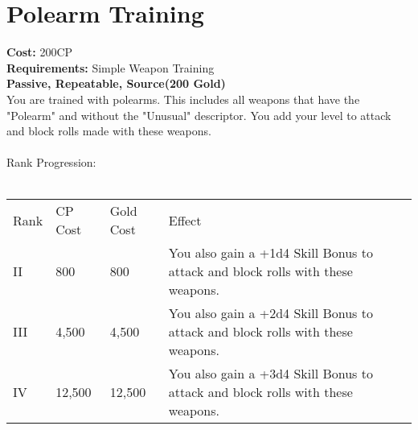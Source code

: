 \section{Polearm Training}\label{perk:polearmTraining}
\textbf{Cost:} 200CP\\
\textbf{Requirements:} Simple Weapon Training\\
\textbf{Passive, Repeatable, Source(200 Gold)}\\
You are trained with polearms.
This includes all weapons that have the "Polearm" and without the "Unusual" descriptor.
You add your level to attack and block rolls made with these weapons.\\
\\
Rank Progression:\\
\\
\begin{tabular}{l | l | l | l}
	Rank & CP Cost & Gold Cost & Effect\\
	II & 800 & 800 & You also gain a +1d4 Skill Bonus to attack and block rolls with these weapons.\\
	III & 4,500 & 4,500 & You also gain a +2d4 Skill Bonus to attack and block rolls with these weapons.\\
	IV & 12,500 & 12,500 & You also gain a +3d4 Skill Bonus to attack and block rolls with these weapons.\\
\end{tabular}
